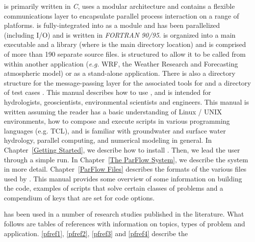 \parflow{} is primarily written in \emph{C}, uses a modular
architecture and contains a flexible communications layer to
encapsulate parallel process interaction on a range of platforms.
 is fully-integrated into \parflow{} as a module and has
been parallelized (including I/O) and is written in \emph{FORTRAN
  90/95}.  \parflow{} is organized into a main executable
 and a library
 (where  is
the main directory location) and is comprised of more than 190
separate source files.  \parflow{} is structured to allow it to be
called from within another application (\emph{e.g.} WRF, the Weather Research 
and Forecasting atmospheric model) or as a
stand-alone application.  There is also a directory structure for the
message-passing layer  for the
associated tools  for 
 and a directory of test cases
.
This manual describes how to use \parflow{}, and is intended for
hydrologists, geoscientists, environmental scientists and engineers. 
This manual is written assuming the reader has a basic understanding
of Linux / UNIX environments, how to compose and execute scripts in various 
programming languages (e.g. TCL), and is familiar with groundwater and 
surface water hydrology, parallel computing, and numerical modeling in general.
In Chapter~\ref{Getting Started}, we describe how to install \parflow{}.
Then, we lead the user through a simple \parflow{} run.  In
Chapter~\ref{The ParFlow System}, we describe the \parflow{} system in
more detail.  Chapter~\ref{ParFlow Files} describes the formats of the
various files used by \parflow{}.  This manual provides some overview of \parflow{}
some information on building the code, examples of scripts that solve certain classes of
problems and a compendium of keys that are set for code options. 

\parflow{} has been used in a number of research studies published in the literature. 
What follows are tables of \parflow{} references with information on topics, types of problem and
application.  \ref{pfref1}, \ref{pfref2}, \ref{pfref3} and \ref{pfref4} describe the  \\
\newpage

